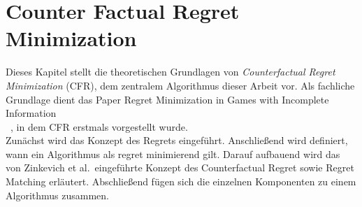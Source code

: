 \section{Counter Factual Regret Minimization}
Dieses Kapitel stellt die theoretischen Grundlagen von \emph{Counterfactual Regret Minimization} (CFR), dem zentralem Algorithmus dieser Arbeit vor.
Als fachliche Grundlage dient das Paper \glqq Regret Minimization in Games with Incomplete Information\grqq \\~\cite{zinkevich2007regret}, in dem CFR erstmals vorgestellt wurde.\\
Zunächst wird das Konzept des Regrets eingeführt.
Anschließend wird definiert, wann ein Algorithmus als regret minimierend gilt.
Darauf aufbauend wird das von Zinkevich et al.\ eingeführte Konzept des Counterfactual Regret sowie Regret Matching erläutert.
Abschließend fügen sich die einzelnen Komponenten zu einem Algorithmus zusammen.






